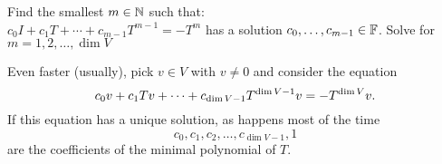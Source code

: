 \setcounter{thm}{23}

 Find the smallest $m \in \mathbb{N}$ such that: \\
$c_0I + c_1 T + \cdots + c_{m-1} T^{m-1} = -T^{m}$ has a solution $c_0, \dots, c_{m-1} \in \mathbb{F}$. Solve for $m=1,2,\dots,\dim V$

Even faster (usually), pick $v \in V$ with $v \neq 0$ and consider the equation
\begin{equation}
  c_0v + c_1Tv + \cdots + c_{\operatorname{dim} V-1}T^{\operatorname{dim} V-1}v=-T^{\operatorname{dim} V}v.
\end{equation}
If this equation has a unique solution, as happens most of the time
\begin{equation}
  c_0, c_1, c_2, \dots, c_{\dim V-1}, 1
\end{equation}
are the coefficients of the minimal polynomial of $T$.

